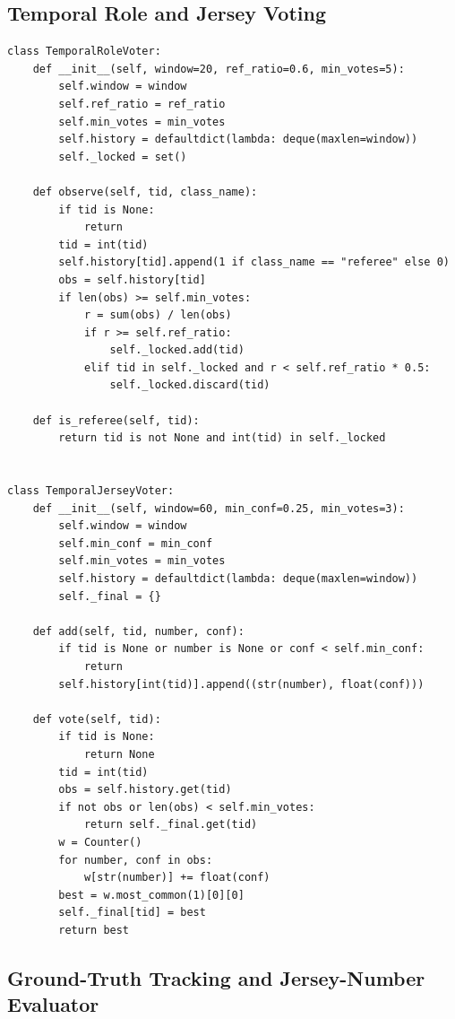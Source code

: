 \subsection{Temporal Role and Jersey Voting}

\begin{lstlisting}[caption={\texttt{TemporalRoleVoter} and \texttt{TemporalJerseyVoter} --- confidence-weighted temporal aggregation for referee exclusion and jersey-number consensus (Section~\ref{sec:temporal-voting}, Equation~\ref{eq:temporal-vote}).}]
class TemporalRoleVoter:
    def __init__(self, window=20, ref_ratio=0.6, min_votes=5):
        self.window = window
        self.ref_ratio = ref_ratio
        self.min_votes = min_votes
        self.history = defaultdict(lambda: deque(maxlen=window))
        self._locked = set()

    def observe(self, tid, class_name):
        if tid is None:
            return
        tid = int(tid)
        self.history[tid].append(1 if class_name == "referee" else 0)
        obs = self.history[tid]
        if len(obs) >= self.min_votes:
            r = sum(obs) / len(obs)
            if r >= self.ref_ratio:
                self._locked.add(tid)
            elif tid in self._locked and r < self.ref_ratio * 0.5:
                self._locked.discard(tid)

    def is_referee(self, tid):
        return tid is not None and int(tid) in self._locked


class TemporalJerseyVoter:
    def __init__(self, window=60, min_conf=0.25, min_votes=3):
        self.window = window
        self.min_conf = min_conf
        self.min_votes = min_votes
        self.history = defaultdict(lambda: deque(maxlen=window))
        self._final = {}

    def add(self, tid, number, conf):
        if tid is None or number is None or conf < self.min_conf:
            return
        self.history[int(tid)].append((str(number), float(conf)))

    def vote(self, tid):
        if tid is None:
            return None
        tid = int(tid)
        obs = self.history.get(tid)
        if not obs or len(obs) < self.min_votes:
            return self._final.get(tid)
        w = Counter()
        for number, conf in obs:
            w[str(number)] += float(conf)
        best = w.most_common(1)[0][0]
        self._final[tid] = best
        return best
\end{lstlisting}

\subsection{Ground-Truth Tracking and Jersey-Number Evaluator}


